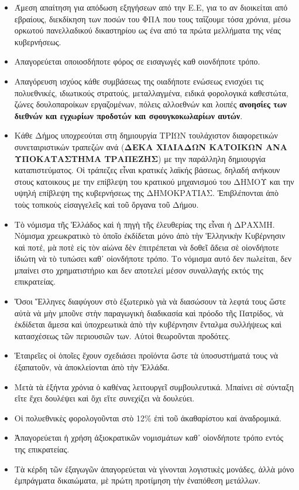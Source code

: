 \documentclass[a4paper]{article}
\begin{document}
\begin{itemize}
\item Άμεση απαίτηση για απόδωση εξηγήσεων από την Ε.Ε, για το αν διοικείται από εβραίους, διεκδίκηση των ποσών του ΦΠΑ που τους ταΐζουμε τόσα χρόνια, μέσω ορκωτού πανελλαδικού δικαστηρίου ως ένα από τα πρώτα μελλήματα της νέας κυβερνήσεως.
\item Απαγορεύεται οποιοσδήποτε φόρος σε εισαγωγές καθ οιονδήποτε τρόπο.
\item Απαγόρευση ισχύος κάθε συμβάσεως της οιαδήποτε ενώσεως ενισχύει τις πολυεθνικές, ιδιωτικούς στρατούς, μεταλλαγμένα, ειδικά φορολογικά καθεστώτα, ζώνες δουλοπαροίκων εργαζομένων, πόλεις αλλοεθνών και λοιπές \textbf{ανοησίες των διεθνών και εγχωρίων προδοτών και σφουγκοκωλαρίων αυτών}.
\item Κάθε Δήμος υποχρεούται στη δημιουργία ΤΡΙΩΝ τουλάχιστον διαφορετικών συνεταιριστικών τραπεζών ανά (\textbf{ΔΕΚΑ ΧΙΛΙΑΔΩΝ ΚΑΤΟΙΚΩΝ ΑΝΑ ΥΠΟΚΑΤΑΣΤΗΜΑ ΤΡΑΠΕΖΗΣ}) με την παράλληλη δημιουργία καταπιστεύματος. Οἱ τράπεζες εἶναι κρατικές λαϊκής βάσεως, δηλαδή ανήκουν στους κατοικους με την επίβλεψη του κρατικού μηχανισμού του ΔΗΜΟΥ και την υψηλή επίβλεψη της κυβερνήσεως της ΔΗΜΟΚΡΑΤΙΑΣ. Ἐπιβλέπονται ἀπὸ τοὺς τοπικοὺς εἰσαγγελεῖς καὶ τοῦ ὄργανα τοῦ Δήμου.
\item Τὸ νόμισμα τῆς Ἑλλάδος καὶ ἡ πηγὴ τῆς ἐλευθερίας της εἶναι ἡ ΔΡΑΧΜΗ. Νόμισμα χρεωκρατικὸ τὸ ὁποῖο ἐκδίδεται μόνο ἀπὸ τὴν Ἑλληνικὴν Κυβέρνησιν καὶ ποτέ, μὰ ποτὲ εἰς τὸν αἰώνα δὲν ἐπιτρέπεται νὰ δοθεῖ ἄδεια σὲ οἱονδήποτε ἰδιώτη νὰ τὸ τυπώσει καθ᾿ οἱονδήποτε τρόπο. Το νόμισμα αυτό δεν πωλείται, δεν μπαίνει στο χρηματιστήριο και δεν αποτελεί μέσον συναλλαγής εκτός της επικρατείας.
\item Ὅσοι Ἕλληνες διαφύγουν στὸ ἐξωτερικὸ γιὰ νὰ διασώσουν τὰ λεφτά τους ὥστε αὐτὰ νὰ μὴν μποῦνε στὴν παραγωγικὴ διαδικασία καὶ πρόοδο τῆς Πατρίδος, νὰ ἐκδίδεται ἄμεσα καὶ ὑποχρεωτικὰ ἀπὸ τὴν κυβέρνησιν ἔνταλμα συλλήψεως καὶ κατασχέσεως τῶν περιουσιῶν των. Αὐτοὶ θεωροῦνται προδότες.
\item Ἑταιρεῖες οἱ ὁποῖες ἔχουν σχεδιάσει προϊόντα ὥστε τὰ ὑποσυστήματά τους νὰ ἐξαπατοῦν, νὰ ἀποκλείονται ἀπὸ τὴν Ἑλλάδα.
\item Μετὰ τὰ ἑξήντα χρόνια ὁ καθένας λειτουργεῖ συμβουλευτικά. Μπαίνει σὲ σύνταξη εἴτε ἔχει δουλέψει καὶ ὄχι εἴτε συνεχίζει νὰ δουλεύει.
\item Οἱ πολυεθνικὲς φορολογοῦνται στὸ 12\% ἐπὶ τοῦ ἀκαθαρίστου καί ἀναδρομικά.
\item Ἀπαγορεύεται ἡ χρήση ἀξιοκρατικῶν νομισμάτων καθ᾿ οἱονδήποτε τρόπο εντός της επικρατείας.
\item Τὰ κέρδη τῶν ἐξαγωγῶν ἀπαγορεύεται νὰ γίνονται λογιστικὲς μονάδες, ἀλλὰ μόνο ἐμπράγματα δικαιώματα, μὲ πρώτη προτίμηση τὴν ἐναπόθεση μετάλλων.

\end{itemize}
\end{document}

